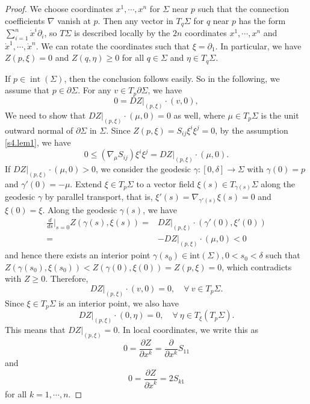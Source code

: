 \documentclass[11pt,reqno]{amsart}
\theoremstyle{definition}
\theoremstyle{remark}
\numberwithin{equation}{section}
\renewcommand{\(}{\left(}
\renewcommand{\)}{\right)}
\renewcommand{\-}{\overline}
\begin{document}
\begin{proof}
We choose coordinates $x^1,\cdots,x^n$ for $\Sigma$ near $p$ such that the connection coefficients $\nabla$ vanish at $p$. Then any vector in $T_q{\Sigma}$ for $q$ near $p$ has the form $\sum_{i=1}^n{\dot{x}^i \partial_i}$, so $T\Sigma$ is described locally by the $2n$ coordinates $x^1,\cdots,x^n$ and $\dot{x}^1,\cdots,\dot{x}^n$. We can rotate the coordinates such that $\xi=\partial_1$. In particular, we have $Z(p,\xi)=0$ and $Z(q,\eta)\geq 0$ for all $q\in\Sigma$ and $\eta\in T_q\Sigma$.

If $p\in\operatorname{int}(\Sigma)$, then the conclusion follows easily. So in the following, we assume that $p\in\partial\Sigma$. For any $v\in T_p \partial\Sigma$, we have
   \begin{equation*}
	0=DZ|_{(p,\xi)}\cdot \left(v,0\right),
	\end{equation*}
	We need to show that $DZ|_{(p,\xi)}\cdot \left(\mu,0\right)=0$ as well, where $\mu\in T_p\Sigma$ is the unit outward normal of $\partial\Sigma$ in $\Sigma$. Since $Z(p,\xi)=S_{ij}\xi^i\xi^j=0$,  by the assumption \eqref{s4.lem1}, we have
	\begin{equation*}
	0\leq \left(\nabla_\mu S_{ij}\right)\xi^i\xi^j=DZ|_{(p,\xi)}\cdot \left(\mu,0\right).
	\end{equation*}
If $DZ|_{(p,\xi)}\cdot \left(\mu,0\right)>0$, we consider the geodesic $\gamma:[0,\delta]\rightarrow \Sigma$ with $\gamma(0)=p$ and $\gamma'(0)=-\mu$. Extend $\xi\in T_p\Sigma$ to a vector field $\xi(s)\in T_{\gamma(s)}\Sigma$ along the geodesic $\gamma$ by parallel transport, that is, $\xi'(s)=\nabla_{\gamma'(s)}\xi(s)=0$ and $\xi(0)=\xi$.  Along the geodesic $\gamma(s)$, we have
\begin{align*}
  \frac{d}{ds}\Big |_{s=0}Z(\gamma(s),\xi(s))=&DZ|_{(p,\xi)}\cdot (\gamma'(0),\xi'(0))\\
  =&-DZ|_{(p,\xi)}\cdot \left(\mu,0\right)<0
\end{align*}
 and hence there exists an interior point $\gamma(s_0)\in\text{int}(\Sigma), 0<s_0<\delta$ such that $Z(\gamma(s_0),\xi(s_0))<Z(\gamma(0),\xi(0))=Z(p,\xi)=0$, which contradicts with $Z\geq 0$. Therefore,
 \begin{equation*}
   DZ|_{(p,\xi)}\cdot (v,0)=0,\quad \forall~v\in T_p\Sigma.
 \end{equation*}
 Since $\xi\in T_p\Sigma$ is an interior point, we also have
  \begin{equation*}
   DZ|_{(p,\xi)}\cdot (0,\eta)=0,\quad \forall~\eta\in T_\xi(T_p\Sigma).
 \end{equation*}
 This means that $DZ|_{(p,\xi)}=0$. In local coordinates, we write this as
	\begin{equation*}
	0=\frac{\partial Z}{\partial x^k}=\frac{\partial}{\partial x^k}S_{11}
	\end{equation*}
and
	\begin{equation*}
	0=\frac{\partial Z}{\partial \dot{x}^k}=2S_{k1}
	\end{equation*}
	for all $k=1,\cdots,n$.


\end{proof}
\end{document}
